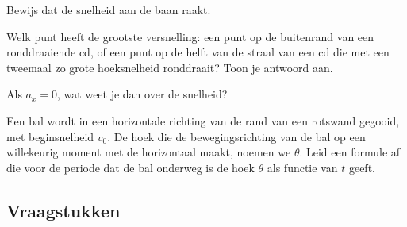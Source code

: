 \documentclass{ximera}
\begin{document}
\begin{exercise} Bewijs dat de snelheid aan de baan raakt.







\end{exercise}

\begin{exercise} Welk punt heeft de grootste versnelling: een punt op de buitenrand van een ronddraaiende cd, of een punt op de helft van de straal van een cd die met een tweemaal zo grote hoeksnelheid ronddraait? Toon je antwoord aan.

\end{exercise}

\begin{exercise} Als $a_x=0$, wat weet je dan over de snelheid?

\end{exercise}

\begin{exercise} Een bal wordt in een horizontale richting van de rand van een rotswand gegooid, met beginsnelheid $v_0$. De hoek die de bewegingsrichting van de bal op een willekeurig moment met de horizontaal maakt, noemen we $\theta$. Leid een formule af die voor de periode dat de bal onderweg is de hoek $\theta$ als functie van $t$ geeft.

\end{exercise}

\subsection{Vraagstukken}

	

\end{document}
